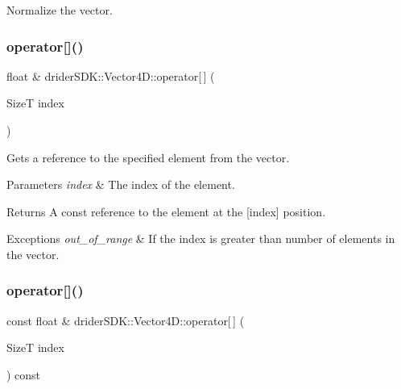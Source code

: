 Normalize the vector. \mbox{\label{classdrider_s_d_k_1_1_vector4_d_a22777557bf66b8adeb50f24f2943fc66}} 
\subsubsection{\texorpdfstring{operator[]()}{operator[]()}\hspace{0.1cm}{\footnotesize\ttfamily [1/2]}}
{\footnotesize\ttfamily float \& drider\+S\+D\+K\+::\+Vector4\+D\+::operator\mbox{[}$\,$\mbox{]} (\begin{DoxyParamCaption}\item[{SizeT}]{index }\end{DoxyParamCaption})}

Gets a reference to the specified element from the vector.


\begin{DoxyParams}{Parameters}
{\em index} & The index of the element.\\
\hline
\end{DoxyParams}
\begin{DoxyReturn}{Returns}
A const reference to the element at the \mbox{[}index\mbox{]} position.
\end{DoxyReturn}

\begin{DoxyExceptions}{Exceptions}
{\em out\+\_\+of\+\_\+range} & If the index is greater than number of elements in the vector. \\
\hline
\end{DoxyExceptions}
\mbox{\label{classdrider_s_d_k_1_1_vector4_d_a6da3ce7013d8b4fef78986433af25971}} 
\subsubsection{\texorpdfstring{operator[]()}{operator[]()}\hspace{0.1cm}{\footnotesize\ttfamily [2/2]}}
{\footnotesize\ttfamily const float \& drider\+S\+D\+K\+::\+Vector4\+D\+::operator\mbox{[}$\,$\mbox{]} (\begin{DoxyParamCaption}\item[{SizeT}]{index }\end{DoxyParamCaption}) const}

